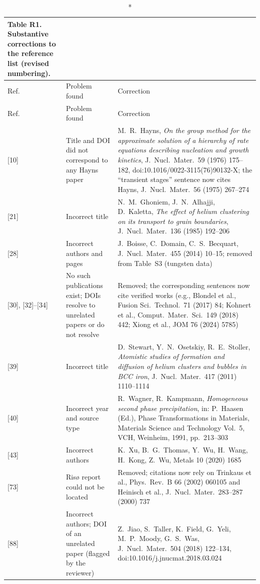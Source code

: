 \documentclass{article}
\begin{document}
\begin{itemize}
{\small
\begin{longtable}{@{}p{}p{}p{}@{}}
\caption*{\textbf{Table R1.} Substantive corrections to the reference list (revised numbering).}\\
\toprule
Ref. & Problem found & Correction \\
\midrule
\endfirsthead
\toprule
Ref. & Problem found & Correction \\
\midrule
\endhead
\bottomrule
\endfoot
{[10]} & Title and DOI did not correspond to any Hayns paper & M.~R.~Hayns, \emph{On the group method for the approximate solution of a hierarchy of rate equations describing nucleation and growth kinetics}, J.~Nucl.\ Mater.\ 59 (1976) 175--182, doi:10.1016/0022-3115(76)90132-X; the ``transient stages'' sentence now cites Hayns, J.~Nucl.\ Mater.\ 56 (1975) 267--274 \\
{[21]} & Incorrect title & N.~M.~Ghoniem, J.~N.~Alhajji, D.~Kaletta, \emph{The effect of helium clustering on its transport to grain boundaries}, J.~Nucl.\ Mater.\ 136 (1985) 192--206 \\
{[28]} & Incorrect authors and pages & J.~Boisse, C.~Domain, C.~S.~Becquart, J.~Nucl.\ Mater.\ 455 (2014) 10--15; removed from Table~S3 (tungsten data) \\
{[30], [32]--[34]} & No such publications exist; DOIs resolve to unrelated papers or do not resolve & Removed; the corresponding sentences now cite verified works (e.g., Blondel et al., Fusion Sci.\ Technol.\ 71 (2017) 84; Kohnert et al., Comput.\ Mater.\ Sci.\ 149 (2018) 442; Xiong et al., JOM 76 (2024) 5785) \\
{[39]} & Incorrect title & D.~Stewart, Y.~N.~Osetskiy, R.~E.~Stoller, \emph{Atomistic studies of formation and diffusion of helium clusters and bubbles in BCC iron}, J.~Nucl.\ Mater.\ 417 (2011) 1110--1114 \\
{[40]} & Incorrect year and source type & R.~Wagner, R.~Kampmann, \emph{Homogeneous second phase precipitation}, in: P.~Haasen (Ed.), Phase Transformations in Materials, Materials Science and Technology Vol.~5, VCH, Weinheim, 1991, pp.~213--303 \\
{[43]} & Incorrect authors & K.~Xu, B.~G.~Thomas, Y.~Wu, H.~Wang, H.~Kong, Z.~Wu, Metals 10 (2020) 1685 \\
{[73]} & Risø report could not be located & Removed; citations now rely on Trinkaus et al., Phys.\ Rev.\ B 66 (2002) 060105 and Heinisch et al., J.~Nucl.\ Mater.\ 283--287 (2000) 737 \\
{[88]} & Incorrect authors; DOI of an unrelated paper (flagged by the reviewer) & Z.~Jiao, S.~Taller, K.~Field, G.~Yeli, M.~P.~Moody, G.~S.~Was, J.~Nucl.\ Mater.\ 504 (2018) 122--134, doi:10.1016/j.jnucmat.2018.03.024 \\

\end{longtable}}
\end{itemize}
\end{document}
